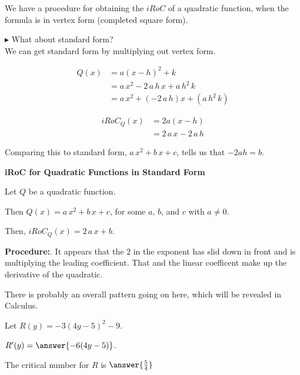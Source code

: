\documentclass{ximera}
\begin{document}
We have a procedure for obtaining the $iRoC$ of a quadratic function, when the formula is in vertex form (completed square form). 

\textbf{\textcolor{blue!55!black}{$\blacktriangleright$}} What about standard form? \\
We can get standard form by multiplying out vertex form. 



\begin{align*}
Q(x) & = a (x - h)^2 + k \\
     & = a \, x^2 - 2 \, a \, h \, x + a \, h^2 \, k \\
     & = a \, x^2  + (- 2 \, a \, h) x + (a \, h^2 \, k) 
\end{align*}


\begin{align*}
iRoC_Q(x) &= 2 a (x - h) \\
          & = 2 \, a \, x - 2 \, a \, h  
\end{align*}


Comparing this to standard form, $a \, x^2 + b \, x + c$, tells us that $-2ah = b$. 


\begin{procedure} \textbf{\textcolor{purple!30!blue}{iRoC for Quadratic Functions in Standard Form}} 



Let $Q$ be a quadratic function.

Then $Q(x) = a \, x^2 + b \, x + c$, for some $a$, $b$, and $c$ with $a \ne 0$. 

Then, $iRoC_Q(x) = 2 \, a \, x + b$. 


\textbf{Procedure:}. It appears that the $2$ in the exponent has slid down in front and is multiplying the leading coefficient. That and the linear coefficent make up the derivative of the quadratic. 



\end{procedure}

There is probably an overall pattern going on here, which will be revealed in Calculus. 









\begin{question}  


Let $R(y) = -3 (4 y - 5)^2 - 9$.

$R'(y) = \answer{-6(4y-5)}$.

The critical number for $R$ is $\answer{\frac{5}{4}}$

\end{question}
\end{document}
